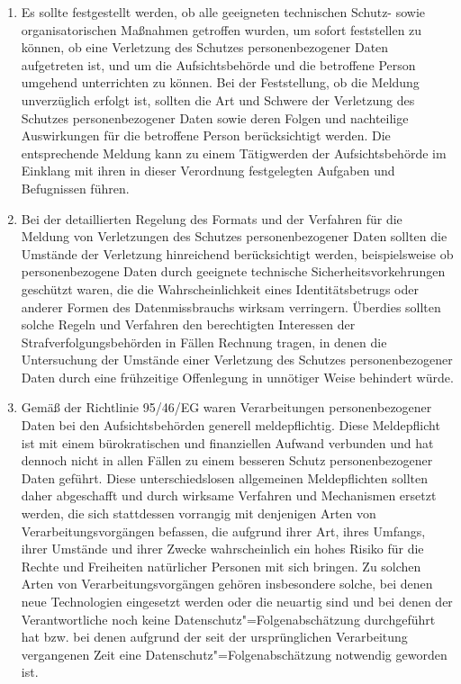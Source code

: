 \begin{enumerate}

   \item Es sollte festgestellt werden, ob alle geeigneten technischen Schutz- sowie organisatorischen Maßnahmen
    getroffen wurden, um sofort feststellen zu können, ob eine Verletzung des Schutzes personenbezogener Daten
    aufgetreten ist, und um die Aufsichtsbehörde und die betroffene Person umgehend unterrichten zu können. Bei der
    Feststellung, ob die Meldung unverzüglich erfolgt ist, sollten die Art und Schwere der Verletzung des Schutzes
    personenbezogener Daten sowie deren Folgen und nachteilige Auswirkungen für die betroffene Person berücksichtigt
    werden. Die entsprechende Meldung kann zu einem Tätigwerden der Aufsichtsbehörde im Einklang mit ihren in dieser
    Verordnung festgelegten Aufgaben und Befugnissen führen.%
   \label{itm:eg-87}
   

   \item Bei der detaillierten Regelung des Formats und der Verfahren für die Meldung von Verletzungen des Schutzes
    personenbezogener Daten sollten die Umstände der Verletzung hinreichend berücksichtigt werden, beispielsweise ob
    personenbezogene Daten durch geeignete technische Sicherheitsvorkehrungen geschützt waren, die die
    Wahrscheinlichkeit eines Identitätsbetrugs oder anderer Formen des Datenmissbrauchs wirksam verringern. Überdies
    sollten solche Regeln und Verfahren den berechtigten Interessen der Strafverfolgungsbehörden in Fällen Rechnung
    tragen, in denen die Untersuchung der Umstände einer Verletzung des Schutzes personenbezogener Daten durch eine
    frühzeitige Offenlegung in unnötiger Weise behindert würde.%
   \label{itm:eg-88}
   

   \item Gemäß der Richtlinie 95/46/EG waren Verarbeitungen personenbezogener Daten bei den Aufsichtsbehörden generell
    meldepflichtig. Diese Meldepflicht ist mit einem bürokratischen und finanziellen Aufwand verbunden und hat dennoch
    nicht in allen Fällen zu einem besseren Schutz personenbezogener Daten geführt. Diese unterschiedslosen allgemeinen
    Meldepflichten sollten daher abgeschafft und durch wirksame Verfahren und Mechanismen ersetzt werden, die sich
    stattdessen vorrangig mit denjenigen Arten von Verarbeitungsvorgängen befassen, die aufgrund ihrer Art, ihres
    Umfangs, ihrer Umstände und ihrer Zwecke wahrscheinlich ein hohes Risiko für die Rechte und Freiheiten natürlicher
    Personen mit sich bringen. Zu solchen Arten von Verarbeitungsvorgängen gehören insbesondere solche, bei denen neue
    Technologien eingesetzt werden oder die neuartig sind und bei denen der Verantwortliche noch keine
    Datenschutz"=Folgenabschätzung durchgeführt hat bzw. bei denen aufgrund der seit der ursprünglichen Verarbeitung
    vergangenen Zeit eine Datenschutz"=Folgenabschätzung notwendig geworden ist.%
   \label{itm:eg-89}
   

\end{enumerate}
